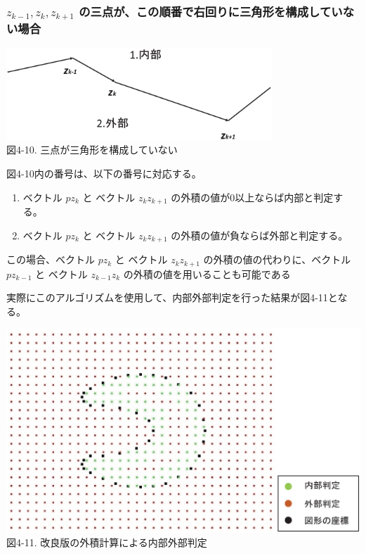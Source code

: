 \subsubsection{$z_{k-1},z_k,z_{k+1}$ の三点が、この順番で右回りに三角形を構成していない場合}

\begin{center}
  \includegraphics[width=10cm]{sen_vec.eps} \\
 \vspace{-1mm}
  図4-10. 三点が三角形を構成していない
\end{center}

図4-10内の番号は、以下の番号に対応する。
\begin{enumerate}
 \item ベクトル $p z_k$ と ベクトル $z_k z_{k+1}$ の外積の値が0以上ならば内部と判定する。
 \item ベクトル $p z_k$ と ベクトル $z_k z_{k+1}$ の外積の値が負ならば外部と判定する。
\end{enumerate}
この場合、ベクトル $p z_k$ と ベクトル $z_k z_{k+1}$ の外積の値の代わりに、ベクトル $p z_{k-1}$ と ベクトル $z_{k-1} z_k$ の外積の値を用いることも可能である

実際にこのアルゴリズムを使用して、内部外部判定を行った結果が図4-11となる。

\vspace{-5mm}
\begin{center}
  \includegraphics[width=14cm]{Cross_result.eps} \\
 \vspace{-10mm}
  図4-11. 改良版の外積計算による内部外部判定
\end{center}

